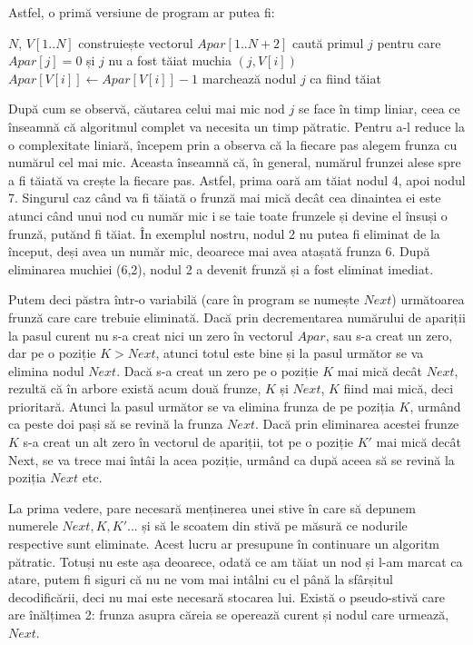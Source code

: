 Astfel, o primă versiune de program ar putea fi:

\vspace{\algskip}
\begin{algorithmic}[1]
  \REQUIRE $N$, $V[1..N]$
  \STATE construiește vectorul $Apar[1..N+2]$
  \STATE caută primul $j$ pentru care $Apar[j]=0$ și $j$ nu a fost tăiat
  \PRINT muchia $(j,V[i])$
  \STATE $Apar[V[i]] \leftarrow Apar[V[i]]-1$
  \STATE marchează nodul $j$ ca fiind tăiat
  \ENDFOR
\end{algorithmic}

După cum se observă, căutarea celui mai mic nod $j$ se face în timp liniar,
ceea ce înseamnă că algoritmul complet va necesita un timp pătratic. Pentru
a-l reduce la o complexitate liniară, începem prin a observa că la fiecare pas
alegem frunza cu numărul cel mai mic. Aceasta înseamnă că, în general, numărul
frunzei alese spre a fi tăiată va crește la fiecare pas. Astfel, prima oară am
tăiat nodul 4, apoi nodul 7. Singurul caz când va fi tăiată o frunză mai mică
decât cea dinaintea ei este atunci când unui nod cu număr mic i se taie toate
frunzele și devine el însuși o frunză, putănd fi tăiat. În exemplul nostru,
nodul 2 nu putea fi eliminat de la început, deși avea un număr mic, deoarece
mai avea atașată frunza 6. După eliminarea muchiei (6,2), nodul 2 a devenit
frunză și a fost eliminat imediat.

Putem deci păstra într-o variabilă (care în program se numește $Next$)
următoarea frunză care care trebuie eliminată. Dacă prin decrementarea
numărului de apariții la pasul curent nu s-a creat nici un zero în vectorul
$Apar$, sau s-a creat un zero, dar pe o poziție $K>Next$, atunci totul este
bine și la pasul următor se va elimina nodul $Next$. Dacă s-a creat un zero pe
o poziție $K$ mai mică decât $Next$, rezultă că în arbore există acum două
frunze, $K$ și $Next$, $K$ fiind mai mică, deci prioritară. Atunci la pasul
următor se va elimina frunza de pe poziția $K$, urmând ca peste doi pași să se
revină la frunza $Next$. Dacă prin eliminarea acestei frunze $K$ s-a creat un
alt zero în vectorul de apariții, tot pe o poziție $K'$ mai mică decât Next,
se va trece mai întâi la acea poziție, urmând ca după aceea să se revină la
poziția $Next$ etc.

La prima vedere, pare necesară menținerea unei stive în care să depunem
numerele $Next, K, K'$... și să le scoatem din stivă pe măsură ce nodurile
respective sunt eliminate. Acest lucru ar presupune în continuare un algoritm
pătratic. Totuși nu este așa deoarece, odată ce am tăiat un nod și l-am marcat
ca atare, putem fi siguri că nu ne vom mai intâlni cu el până la sfârșitul
decodificării, deci nu mai este necesară stocarea lui. Există o pseudo-stivă
care are înălțimea 2: frunza asupra căreia se operează curent și nodul care
urmează, $Next$.

